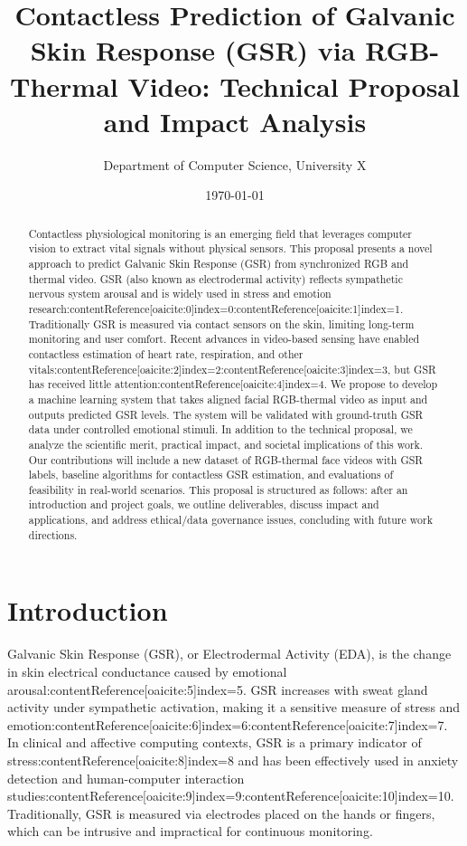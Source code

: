 \documentclass[12pt]{article}
\title{\textbf{Contactless Prediction of Galvanic Skin Response (GSR) via RGB-Thermal Video: Technical Proposal and Impact Analysis}}
\author{Department of Computer Science, University X}
\date{\today}
\begin{document}
    \maketitle

    \begin{abstract}
        Contactless physiological monitoring is an emerging field that leverages computer vision to extract vital signals without physical sensors. This proposal presents a novel approach to predict Galvanic Skin Response (GSR) from synchronized RGB and thermal video. GSR (also known as electrodermal activity) reflects sympathetic nervous system arousal and is widely used in stress and emotion research:contentReference[oaicite:0]{index=0}:contentReference[oaicite:1]{index=1}. Traditionally GSR is measured via contact sensors on the skin, limiting long-term monitoring and user comfort. Recent advances in video-based sensing have enabled contactless estimation of heart rate, respiration, and other vitals:contentReference[oaicite:2]{index=2}:contentReference[oaicite:3]{index=3}, but GSR has received little attention:contentReference[oaicite:4]{index=4}. We propose to develop a machine learning system that takes aligned facial RGB-thermal video as input and outputs predicted GSR levels. The system will be validated with ground-truth GSR data under controlled emotional stimuli. In addition to the technical proposal, we analyze the scientific merit, practical impact, and societal implications of this work. Our contributions will include a new dataset of RGB-thermal face videos with GSR labels, baseline algorithms for contactless GSR estimation, and evaluations of feasibility in real-world scenarios. This proposal is structured as follows: after an introduction and project goals, we outline deliverables, discuss impact and applications, and address ethical/data governance issues, concluding with future work directions.
    \end{abstract}

    \tableofcontents


    \section{Introduction}
    Galvanic Skin Response (GSR), or Electrodermal Activity (EDA), is the change in skin electrical conductance caused by emotional arousal:contentReference[oaicite:5]{index=5}. GSR increases with sweat gland activity under sympathetic activation, making it a sensitive measure of stress and emotion:contentReference[oaicite:6]{index=6}:contentReference[oaicite:7]{index=7}. In clinical and affective computing contexts, GSR is a primary indicator of stress:contentReference[oaicite:8]{index=8} and has been effectively used in anxiety detection and human-computer interaction studies:contentReference[oaicite:9]{index=9}:contentReference[oaicite:10]{index=10}. Traditionally, GSR is measured via electrodes placed on the hands or fingers, which can be intrusive and impractical for continuous monitoring.
\end{document}
